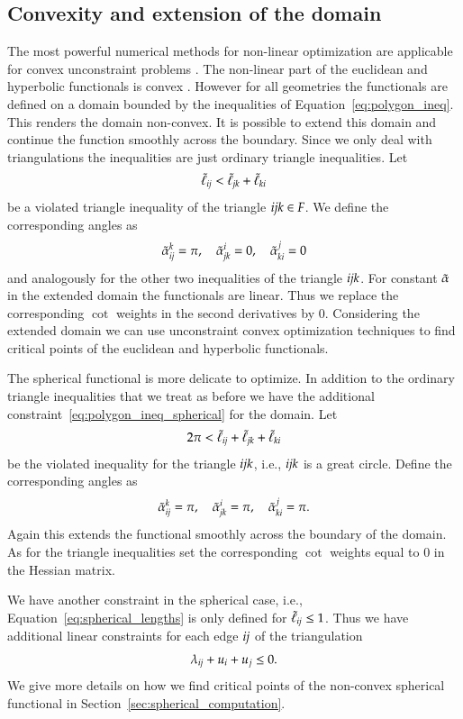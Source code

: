 \documentclass[Thesis]{subfiles}
\begin{document}
\subsection{Convexity and extension of the domain}
\label{sec:convexity_extension}

The most powerful numerical methods for non-linear optimization are applicable for convex unconstraint problems \cite{boyd2004convex}.
The non-linear part of the euclidean and hyperbolic functionals is convex \cite{Bobenko2010}. 
However for all geometries the functionals are defined on a domain bounded by the inequalities of Equation~\ref{eq:polygon_ineq}.
This renders the domain non-convex. 
It is possible to extend this domain and continue the function smoothly across the boundary.
Since we only deal with triangulations the inequalities are just ordinary triangle inequalities. 
Let 
\[\tilde{\ell}_{\it ij} < \tilde{\ell}_{\it jk} + \tilde{\ell}_{\it ki}\] 
be a violated triangle inequality of the triangle $\it ijk \in F$. We define the corresponding angles as
\begin{equation*}
\tilde{\alpha}^k_{\it ij} = \pi,\quad \tilde{\alpha}^i_{\it jk} = 0,\quad \tilde{\alpha}^j_{\it ki} = 0
\end{equation*}
and analogously for the other two inequalities of the triangle $\it ijk$. 
For constant $\tilde{\alpha}$ in the extended domain the functionals are linear.
Thus we replace the corresponding $\cot$ weights in the second derivatives by $0$.
Considering the extended domain we can use unconstraint convex optimization techniques to find critical points of the euclidean and hyperbolic functionals.

The spherical functional is more delicate to optimize.
In addition to the ordinary triangle inequalities that we treat as before we have the additional constraint~\ref{eq:polygon_ineq_spherical} for the domain.
Let 
\[2\pi < \tilde{\ell}_{\it ij} + \tilde{\ell}_{\it jk} + \tilde{\ell}_{\it ki}\]
be the violated inequality for the triangle $\it ijk$, i.e., $\it ijk$ is a great circle. 
Define the corresponding angles as
\begin{equation*}
\tilde{\alpha}^k_{\it ij} = \pi,\quad \tilde{\alpha}^i_{\it jk} = \pi,\quad \tilde{\alpha}^j_{\it ki} = \pi.
\end{equation*}
Again this extends the functional smoothly across the boundary of the domain. 
As for the triangle inequalities set the corresponding $\cot$ weights equal to $0$ in the Hessian matrix.

We have another constraint in the spherical case, i.e., Equation~\ref{eq:spherical_lengths} is only defined for $\tilde\ell_{\it ij} \leq 1$.
Thus we have additional linear constraints for each edge $\it ij$ of the triangulation
\[\lambda_{\it ij} + u_i + u_j \leq 0.\]
We give more details on how we find critical points of the non-convex spherical functional in Section~\ref{sec:spherical_computation}.
\end{document}
